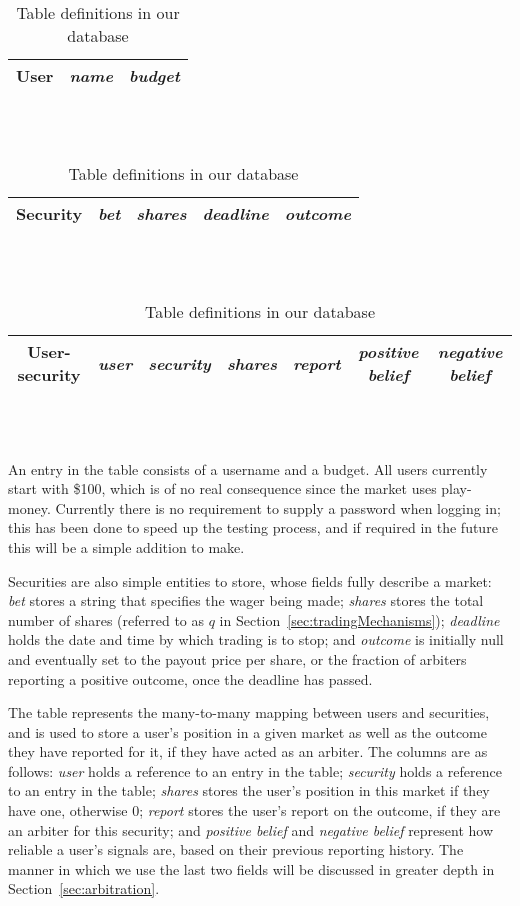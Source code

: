 \begin{table}[ht]
	\label{tab:tableDefinitions}
	\centering
	\begin{tabular}{|c|c|c|}
		\hline
		\textbf{User} & \emph{name} & \emph{budget} \\ \hline
	\end{tabular} \\~\\

	\begin{tabular}{|c|c|c|c|c|}
		\hline
		\textbf{Security} & \emph{bet} & \emph{shares} & \emph{deadline} &
		\emph{outcome} \\ \hline
	\end{tabular} \\~\\

	\begin{tabular}{|c|c|c|c|c|c|c|}
		\hline
		\textbf{User-security} & \emph{user} & \emph{security} & \emph{shares}
		& \emph{report} & \emph{positive belief} & \emph{negative belief} \\
		\hline
	\end{tabular} \\~\\
	\caption{Table definitions in our database}
\end{table}

An entry in the  table consists of a username and a budget. All
users currently start with \$100, which is of no real consequence since the
market uses play-money. Currently there is no requirement to supply a password
when logging in; this has been done to speed up the testing process, and if
required in the future this will be a simple addition to make.

Securities are also simple entities to store, whose fields fully describe a
market: \emph{bet} stores a string that specifies the wager being made;
\emph{shares} stores the total number of shares (referred to as $q$ in
Section~\ref{sec:tradingMechanisms}); \emph{deadline} holds the date and time
by which trading is to stop; and \emph{outcome} is initially null and
eventually set to the payout price per share, or the fraction of arbiters
reporting a positive outcome, once the deadline has passed.

The  table represents the many-to-many mapping between
users and securities, and is used to store a user's position in a given market
as well as the outcome they have reported for it, if they have acted as an
arbiter. The columns are as follows: \emph{user} holds a reference to an entry
in the  table; \emph{security} holds a reference to an entry in the
 table; \emph{shares} stores the user's position in this market
if they have one, otherwise 0; \emph{report} stores the user's report on the
outcome, if they are an arbiter for this security; and \emph{positive belief}
and \emph{negative belief} represent how reliable a user's signals are, based
on their previous reporting history. The manner in which we use the last two
fields will be discussed in greater depth in Section~\ref{sec:arbitration}.

